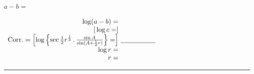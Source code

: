 \par\bigskip
\noindent\begin{minipage}[t]{.34\linewidth}\centering $a-b=$\end{minipage}\hfill
\begin{minipage}[t]{.65\linewidth}\raggedleft
$\begin{array}{r@{\ }l}
\log(a-b)=&\\
{[}\log c=]&\\
\mathrm{Corr.}=\left[\log\left\{\sec\tfrac12r^{\frac13}\,.\,\frac{\sin A}{\sin(A+\frac12r)}\right\}=\right]&\underline{\hspace{1.8cm}}\\
\log r=&\\
r=&
\end{array}$
\end{minipage}
\begin{center}\vspace{1cm}\rule{2.7cm}{.4pt}\end{center}

